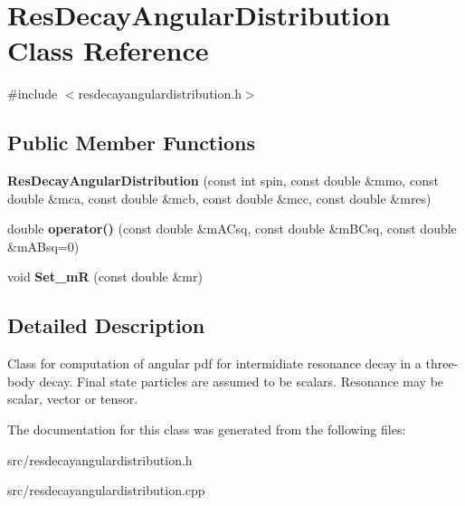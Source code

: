 \hypertarget{class_res_decay_angular_distribution}{}\section{Res\+Decay\+Angular\+Distribution Class Reference}
\label{class_res_decay_angular_distribution}


{\ttfamily \#include $<$resdecayangulardistribution.\+h$>$}

\subsection*{Public Member Functions}
\begin{DoxyCompactItemize}
\item 
\hypertarget{class_res_decay_angular_distribution_ac6c51a327e10847d9dba1ed5e07b226f}{}{\bfseries Res\+Decay\+Angular\+Distribution} (const int spin, const double \&mmo, const double \&mca, const double \&mcb, const double \&mcc, const double \&mres)\label{class_res_decay_angular_distribution_ac6c51a327e10847d9dba1ed5e07b226f}

\item 
\hypertarget{class_res_decay_angular_distribution_a01c7c4945ca86df562c0aa682768cbd0}{}double {\bfseries operator()} (const double \&m\+A\+Csq, const double \&m\+B\+Csq, const double \&m\+A\+Bsq=0)\label{class_res_decay_angular_distribution_a01c7c4945ca86df562c0aa682768cbd0}

\item 
\hypertarget{class_res_decay_angular_distribution_a727a9b504ce30f24a1289a947c4b0878}{}void {\bfseries Set\+\_\+m\+R} (const double \&mr)\label{class_res_decay_angular_distribution_a727a9b504ce30f24a1289a947c4b0878}

\end{DoxyCompactItemize}


\subsection{Detailed Description}
Class for computation of angular pdf for intermidiate resonance decay in a three-\/body decay. Final state particles are assumed to be scalars. Resonance may be scalar, vector or tensor. 

The documentation for this class was generated from the following files\+:\begin{DoxyCompactItemize}
\item 
src/resdecayangulardistribution.\+h\item 
src/resdecayangulardistribution.\+cpp\end{DoxyCompactItemize}
